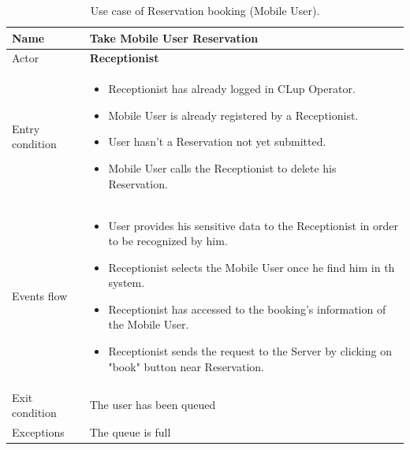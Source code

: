 \begin{table}[H]\begin{tabular}{|p{5cm} | p{7cm} | }
	\hline
	Name & \textbf{Take Mobile User Reservation} \\
	\hline
	Actor & \textbf{Receptionist} \\
	\hline
	Entry condition &
	\begin{itemize}
		\item Receptionist has already logged in CLup Operator. 
 		\item Mobile User is already registered by a Receptionist.
		\item User hasn't a Reservation not yet submitted. 
        \item Mobile User calls the Receptionist to delete his Reservation.
	\end{itemize} \\
	\hline
	Events flow & 
	\begin{itemize}
        \item User provides his sensitive data to the Receptionist in order to be recognized by him. 
        \item Receptionist selects the Mobile User once he find him in th system.
		\item Receptionist has accessed to the booking's information of the Mobile User.
        \item Receptionist sends the request to the Server by clicking on "book" button near Reservation.
	\end{itemize} \\
	\hline
	Exit condition &
	The user has been queued \\
	\hline 
	Exceptions & 
	The queue is full \\
	\hline
\end{tabular}
\caption{Use case of Reservation booking (Mobile User).}

\end{table}
\bigbreak

